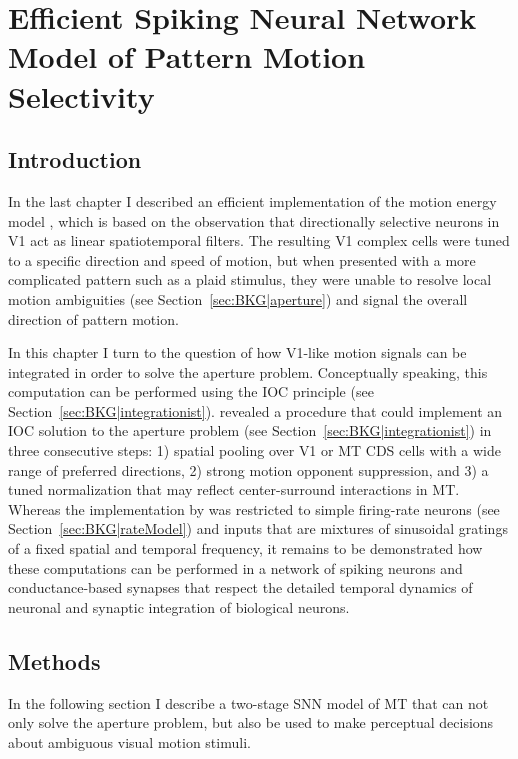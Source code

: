 \chapter{Efficient Spiking Neural Network Model of Pattern Motion Selectivity}
\label{ch:MT}

\section{Introduction}
In the last chapter I described an efficient implementation of the motion
energy model \citep{SimoncelliHeeger1998}, which is based on the observation
that directionally selective neurons in \ac{V1} act as linear spatiotemporal
filters.
The resulting \ac{V1} complex cells were tuned to a specific direction and
speed of motion, but when presented with a more complicated pattern such as a
plaid stimulus, they were unable to resolve local motion ambiguities
(see Section~\ref{sec:BKG|aperture}) and signal the overall direction of
pattern motion.

In this chapter I turn to the question of how \ac{V1}-like motion signals
can be integrated in order to solve the aperture problem.
Conceptually speaking, this computation can be performed using the 
\ac{IOC} principle (see Section~\ref{sec:BKG|integrationist}).
\cite{Rust2006} revealed a procedure that could implement an \ac{IOC} solution
to the aperture problem (see Section~\ref{sec:BKG|integrationist})
in three consecutive steps: 1) spatial pooling over \ac{V1} or \ac{MT} \ac{CDS}
cells with a wide range of preferred directions, 2) strong
motion opponent suppression, and 3) a tuned normalization
that may reflect center-surround interactions in \ac{MT}.
Whereas the implementation by \cite{Rust2006} was restricted to
simple firing-rate neurons (see Section~\ref{sec:BKG|rateModel}) and
inputs that are mixtures of sinusoidal gratings of a fixed spatial
and temporal frequency, it remains to be demonstrated how these computations
can be performed in a network of spiking neurons \citep{Izhikevich2003}
and conductance-based synapses
that respect the detailed temporal dynamics of neuronal
and synaptic integration of biological neurons.


\section{Methods}

In the following section I describe a two-stage \ac{SNN} model of \ac{MT}
that can not only solve the aperture problem, but also be used to make
perceptual decisions about ambiguous visual motion stimuli.

